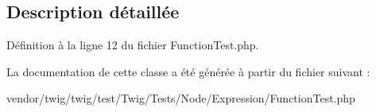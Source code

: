 \subsection{Description détaillée}


Définition à la ligne 12 du fichier Function\+Test.\+php.



La documentation de cette classe a été générée à partir du fichier suivant \+:\begin{DoxyCompactItemize}
\item 
vendor/twig/twig/test/\+Twig/\+Tests/\+Node/\+Expression/Function\+Test.\+php\end{DoxyCompactItemize}
